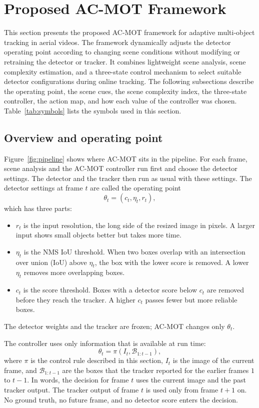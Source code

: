 \documentclass[pdflatex,sn-mathphys-num,iicol]{sn-jnl}
\begin{document}
\section{Proposed AC-MOT Framework}\label{sec:method}
This section presents the proposed AC-MOT framework for adaptive multi-object tracking in aerial videos. The framework dynamically adjusts the detector operating point according to changing scene conditions without modifying or retraining the detector or tracker. It combines lightweight scene analysis, scene complexity estimation, and a three-state control mechanism to select suitable detector configurations during online tracking. The following subsections describe the operating point, the scene cues, the scene complexity index, the three-state controller, the action map, and how each value of the controller was chosen. Table~\ref{tab:symbols} lists the symbols used in this section.

\subsection{Overview and operating point}
Figure~\ref{fig:pipeline} shows where AC-MOT sits in the pipeline. For each
frame, scene analysis and the AC-MOT controller run first and choose the
detector settings. The detector and the tracker then run as usual with these
settings. The detector settings at frame $t$ are called the operating point
\begin{equation}
\theta_t = (c_t, \eta_t, r_t),
\label{eq:theta}
\end{equation}
which has three parts:
\begin{itemize}
\item $r_t$ is the input resolution, the long side of the resized image in
      pixels. A larger input shows small objects better but takes more time.
\item $\eta_t$ is the NMS IoU threshold. When two boxes overlap with an
      intersection over union (IoU) above $\eta_t$, the box with the lower
      score is removed. A lower $\eta_t$ removes more overlapping boxes.
\item $c_t$ is the score threshold. Boxes with a detector score below $c_t$
      are removed before they reach the tracker. A higher $c_t$ passes fewer
      but more reliable boxes.
\end{itemize}
The detector weights and the tracker are frozen; AC-MOT changes only
$\theta_t$.

The controller uses only information that is available at run time:
\begin{equation}
\theta_t = \pi\left(I_t, \mathcal{B}_{1:t-1}\right),
\label{eq:policy}
\end{equation}
where $\pi$ is the control rule described in this section, $I_t$ is the image
of the current frame, and $\mathcal{B}_{1:t-1}$ are the boxes that the tracker
reported for the earlier frames $1$ to $t-1$. In words, the decision for frame
$t$ uses the current image and the past tracker output. The tracker output of
frame $t$ is used only from frame $t+1$ on. No ground truth, no future frame,
and no detector score enters the decision.
\end{document}
